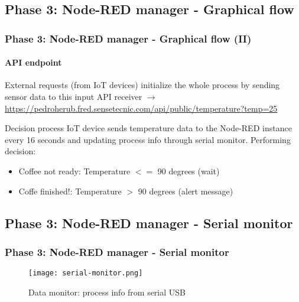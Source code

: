 \documentclass[
    aspectratio=169,                   %
]{beamer}
\begin{document}
\subsection{Phase 3: Node-RED manager - Graphical flow}

    \begin{frame}
        \frametitle{Phase 3: Node-RED manager - Graphical flow (II)}

        \paragraph{API endpoint} External requests (from IoT devices) initialize the whole process by sending sensor data to this input API receiver $\rightarrow$  \url{https://pedroherub.fred.sensetecnic.com/api/public/temperature?temp=25}

        \begin{block}{Decision process}
            IoT device sends temperature data to the Node-RED instance every 16 seconds and updating process info through serial monitor. Performing decision:
            \begin{itemize}
                \item \alert{Coffee not ready}: Temperature $<=$ 90 degrees (wait)
                \item \alert{Coffe finished!}: Temperature $>$ 90 degrees (alert message)
            \end{itemize}
        \end{block}
        
    \end{frame}

\subsection{Phase 3: Node-RED manager - Serial monitor}

    \begin{frame}
        \frametitle{Phase 3: Node-RED manager - Serial monitor}

        \begin{figure}
            \centering
            \begin{stampbox}
                \texttt{[image: serial-monitor.png]}
            \end{stampbox}
            \caption{Data monitor: process info from serial USB}
        \end{figure}

    \end{frame}
\end{document}

